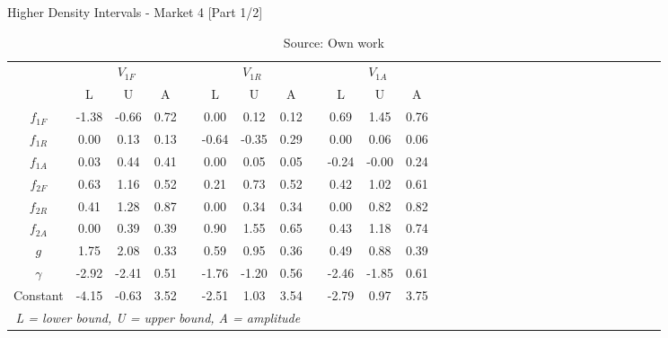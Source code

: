 \begin{table}
\caption{Higher Density Intervals -  Market 4 [Part 1/2]}
\centering
\begin{tabular}{cccccccccccccccccccccccccccccc}
  \toprule
 & \multicolumn{3}{c}{$V_{1F}$} && \multicolumn{3}{c}{$V_{1R}$} && \multicolumn{3}{c}{$V_{1A}$} \\ 
\cline{2-4} \cline{6-8} \cline{10-12}
            & L  & U   & A &&  L  & U   & A &&  L  & U   & A \\
  \hline
  $f_{1F}$ & -1.38 & -0.66 & 0.72 && 0.00  & 0.12  & 0.12 && 0.69  & 1.45  & 0.76 \\   
  $f_{1R}$ & 0.00  & 0.13  & 0.13 && -0.64 & -0.35 & 0.29 && 0.00  & 0.06  & 0.06 \\   
  $f_{1A}$ & 0.03  & 0.44  & 0.41 && 0.00  & 0.05  & 0.05 && -0.24 & -0.00 & 0.24 \\   
  $f_{2F}$ & 0.63  & 1.16  & 0.52 && 0.21  & 0.73  & 0.52 && 0.42  & 1.02  & 0.61 \\   
  $f_{2R}$ & 0.41  & 1.28  & 0.87 && 0.00  & 0.34  & 0.34 && 0.00  & 0.82  & 0.82 \\   
  $f_{2A}$ & 0.00  & 0.39  & 0.39 && 0.90  & 1.55  & 0.65 && 0.43  & 1.18  & 0.74 \\   
  $g$      & 1.75  & 2.08  & 0.33 && 0.59  & 0.95  & 0.36 && 0.49  & 0.88  & 0.39 \\   
  $\gamma$ & -2.92 & -2.41 & 0.51 && -1.76 & -1.20 & 0.56 && -2.46 & -1.85 & 0.61 \\   
  Constant & -4.15 & -0.63 & 3.52 && -2.51 & 1.03  & 3.54 && -2.79 & 0.97  & 3.75 \\   
  \hline
  \multicolumn{8}{c}{\textit{L = lower bound, U = upper bound, A = amplitude}}\\
  \bottomrule
 \end{tabular}
\caption*{Source: Own work}
\end{table}

